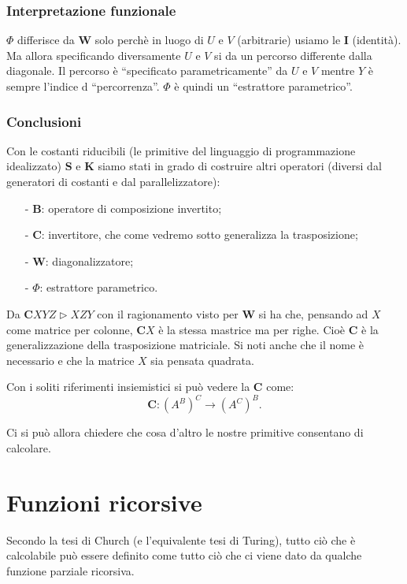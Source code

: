 \documentclass{book}
\newcommand*{\ii}{\mathbf{I}}    %
\newcommand*{\kk}{\mathbf{K}}    %
\newcommand*{\sss}{\mathbf{S}}   %
\newcommand*{\cc}{\mathbf{C}}    %
\newcommand*{\bb}{\mathbf{B}}    %
\newcommand*{\ww}{\mathbf{W}}    %
\begin{document}
\subsection{Interpretazione funzionale}
$\Phi$ differisce da $\ww$ solo perch\`e in luogo di $U$ e $V$ (arbitrarie) 
usiamo le $\ii$ (identit\`a).
Ma allora specificando diversamente $U$ e $V$ si da un percorso differente 
dalla diagonale. Il percorso \`e ``specificato parametricamente'' da $U$ e $V$
mentre $Y$ \`e sempre l'indice d ``percorrenza''.
$\Phi$ \`e quindi un ``estrattore parametrico''.

\subsection{Conclusioni}
Con le costanti riducibili (le primitive del linguaggio di programmazione
idealizzato) $\sss$ e $\kk$ siamo stati in grado di costruire altri operatori
(diversi dal generatori di costanti e dal parallelizzatore):

\begin{enumerate}
\item[-]$\bb$: operatore di composizione invertito;
\item[-]$\cc$: invertitore, che come vedremo sotto generalizza la 
trasposizione;
\item[-]$\ww$: diagonalizzatore;
\item[-]$\Phi$: estrattore parametrico.  
\end{enumerate}


Da $\cc XYZ \vartriangleright XZY$ con il ragionamento visto per $\ww$ si ha 
che, pensando ad $X$ come matrice per colonne, $\cc X$ \`e la stessa mastrice 
ma per righe. Cio\`e $\cc$ \`e la generalizzazione della trasposizione 
matriciale.
Si noti anche che il nome \`e necessario e che la matrice $X$ sia pensata
quadrata.

Con i soliti riferimenti insiemistici si pu\`o vedere la $\cc$ come:
\[
\cc \colon (A^B)^C \to (A^C)^B.
\]

Ci si pu\`o allora chiedere che cosa d'altro le nostre primitive consentano di
calcolare.

\chapter{Funzioni ricorsive}
Secondo la tesi di Church (e l'equivalente tesi di Turing), tutto ci\`o
che \`e calcolabile pu\`o essere definito come tutto ci\`o che ci viene dato 
da qualche funzione parziale ricorsiva.
\end{document}
